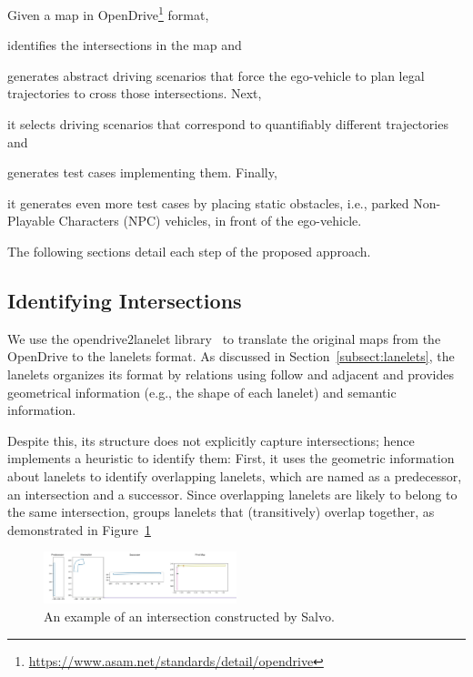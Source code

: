 \documentclass[conference]{IEEEtran}
\begin{document}
Given a map in OpenDrive\footnote{\href{https://www.asam.net/standards/detail/opendrive/}{https://www.asam.net/standards/detail/opendrive}}  format, \tool 
\begin{inparaenum}[(1)]
\item identifies the intersections in the map and 
\item generates abstract driving scenarios that force the ego-vehicle to plan legal trajectories to cross those intersections. Next, \item it selects driving scenarios that correspond to quantifiably different trajectories and
\item generates test cases implementing them. 
Finally, \item it generates even more test cases by placing static obstacles, i.e., parked Non-Playable Characters (NPC) vehicles, in front of the ego-vehicle.
\end{inparaenum}

The following sections detail each step of the proposed approach.

\subsection{Identifying Intersections}
We use the opendrive2lanelet library~\cite{althoff2018automatic} to translate the original maps from the OpenDrive to the lanelets format. As discussed in Section~\ref{subsect:lanelets}, the lanelets organizes its format by relations using follow and adjacent and provides geometrical information (e.g., the shape of each lanelet) and semantic information. 

Despite this, its structure does not explicitly capture intersections; hence \tool implements a heuristic to identify them: First, it uses the geometric information about lanelets to identify overlapping lanelets, which are named as a predecessor, an intersection and a successor. Since overlapping lanelets are likely to belong to the same intersection, \tool groups lanelets that (transitively) overlap together, as demonstrated in Figure~\ref{fig:intersection_a}
%
\begin{figure}[H]
  \centering
    \includegraphics[width=0.5\textwidth]{images/intersection01}
  \caption{An example of an intersection constructed by Salvo.}
  \label{fig:intersection_a}
\end{figure}
\end{document}
